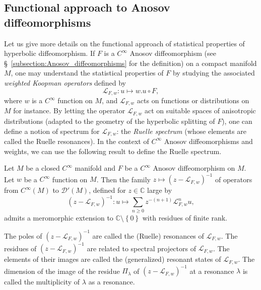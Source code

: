 \documentclass[AHL,Unicode,longabstracts,published]{cedram}
\newcommand{\set}[1]{\left\{ #1 \right\}}
\newcommand{\clL}{\mathcal{L}}
\newcommand{\clD}{\mathcal{D}}
\newcommand{\bbC}{\mathbb{C}}
\begin{document}
\subsection{Functional approach to Anosov diffeomorphisms}

Let us give more details on the functional approach of statistical properties of hyperbolic diffeomorphism. If $F$ is a $C^\infty$ Anosov diffeomorphism (see \S~\ref{subsection:Anosov_diffeomorphisms} for the definition) on a compact manifold $M$, one may understand the statistical properties of $F$ by studying the associated \emph{weighted Koopman operators} defined by
\begin{equation}\label{eq:def_Koopman}
\clL_{F,w} : u \mapsto w. u \circ F,
\end{equation}
where $w$ is a $C^\infty$ function on $M$, and $\clL_{F,w}$ acts on functions or distributions on $M$ for instance. By letting the operator $\clL_{F,w}$ act on suitable spaces of anisotropic distributions (adapted to the geometry of the hyperbolic splitting of $F$), one can define a notion of spectrum for $\clL_{F,w}$: the \emph{Ruelle spectrum} (whose elements are called the Ruelle resonances). In the context of $C^\infty$ Anosov diffeomorphisms and weights, we can use the following result to define the Ruelle spectrum.

\begin{theo}\label{theorem:resonances}
Let $M$ be a closed $C^\infty$ manifold and $F$ be a $C^\infty$ Anosov diffeomorphism on $M$. Let $w$ be a $C^\infty$ function on $M$. Then the family $z \mapsto (z - \clL_{F,w})^{-1}$ of operators from $C^\infty(M)$ to $\clD'(M)$, defined for $z \in \bbC$ large by
\begin{equation*}
(z - \clL_{F,w})^{-1} : u \mapsto \sum_{n\geq0} z^{-(n+1)} \clL_{F,w}^n u,
\end{equation*}
admits a meromorphic extension to $\bbC \setminus \set{0}$ with residues of finite rank.
\end{theo}

The poles of $(z - \clL_{F,w})^{-1}$ are called the (Ruelle) resonances of $\clL_{F,w}$. The residues of $(z - \clL_{F,w})^{-1}$ are related to spectral projectors of $\clL_{F,w}$. The elements of their images are called the (generalized) resonant states of $\clL_{F,w}$. The dimension of the image of the residue $\Pi_\lambda$ of $(z - \clL_{F,w})^{-1}$ at a resonance $\lambda$ is called the multiplicity of $\lambda$ as a resonance.
\end{document}
